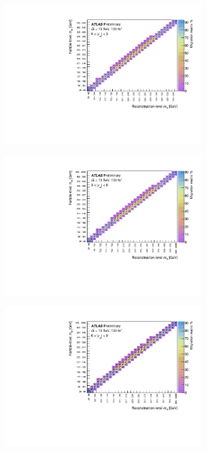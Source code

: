 \begin{figure}[htb]
  \centering
  \begin{subfigure}{.49\textwidth}\centering\includegraphics[width = 0.95\textwidth]{Figures/m4l/UnfoldingStudies/v014_matrices/m4l_y4l0-3Matrix.pdf}\end{subfigure}
  \begin{subfigure}{.49\textwidth}\centering\includegraphics[width = 0.95\textwidth]{Figures/m4l/UnfoldingStudies/v014_matrices/m4l_y4l3-6Matrix.pdf}\end{subfigure}
  \begin{subfigure}{.49\textwidth}\centering\includegraphics[width = 0.95\textwidth]{Figures/m4l/UnfoldingStudies/v014_matrices/m4l_y4l6-9Matrix.pdf}\end{subfigure}

\end{figure}
